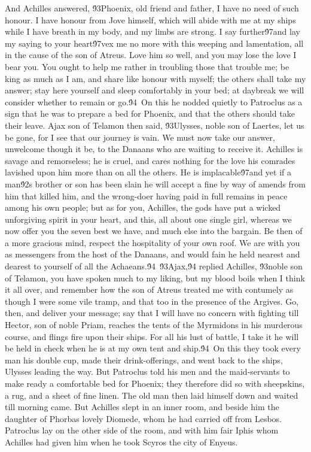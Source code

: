 {And Achilles answered, \'93Phoenix, old friend and father, I have no need of such honour. I have honour from Jove himself, which will abide with me at my ships while I have breath in my body, and my limbs are strong. I say further\'97and lay my saying to your heart\'97vex me no more with this weeping and lamentation, all in the cause of the son of Atreus. Love him so well, and you may lose the love I bear you. You ought to help me rather in troubling those that trouble me; be king as much as I am, and share like honour with myself; the others shall take my answer; stay here yourself and sleep comfortably in your bed; at daybreak we will consider whether to remain or go.\'94\
On this he nodded quietly to Patroclus as a sign that he was to prepare a bed for Phoenix, and that the others should take their leave. Ajax son of Telamon then said, \'93Ulysses, noble son of Laertes, let us be gone, for I see that our journey is vain. We must now take our answer, unwelcome though it be, to the Danaans who are waiting to receive it. Achilles is savage and remorseless; he is cruel, and cares nothing for the love his comrades lavished upon him more than on all the others. He is implacable\'97and yet if a man\'92s brother or son has been slain he will accept a fine by way of amends from him that killed him, and the wrong-doer having paid in full remains in peace among his own people; but as for you, Achilles, the gods have put a wicked unforgiving spirit in your heart, and this, all about one single girl, whereas we now offer you the seven best we have, and much else into the bargain. Be then of a more gracious mind, respect the hospitality of your own roof. We are with you as messengers from the host of the Danaans, and would fain he held nearest and dearest to yourself of all the Achaeans.\'94\
\'93Ajax,\'94 replied Achilles, \'93noble son of Telamon, you have spoken much to my liking, but my blood boils when I think it all over, and remember how the son of Atreus treated me with contumely as though I were some vile tramp, and that too in the presence of the Argives. Go, then, and deliver your message; say that I will have no concern with fighting till Hector, son of noble Priam, reaches the tents of the Myrmidons in his murderous course, and flings fire upon their ships. For all his lust of battle, I take it he will be held in check when he is at my own tent and ship.\'94\
On this they took every man his double cup, made their drink-offerings, and went back to the ships, Ulysses leading the way. But Patroclus told his men and the maid-servants to make ready a comfortable bed for Phoenix; they therefore did so with sheepskins, a rug, and a sheet of fine linen. The old man then laid himself down and waited till morning came. But Achilles slept in an inner room, and beside him the daughter of Phorbas lovely Diomede, whom he had carried off from Lesbos. Patroclus lay on the other side of the room, and with him fair Iphis whom Achilles had given him when he took Scyros the city of Enyeus.\
}
